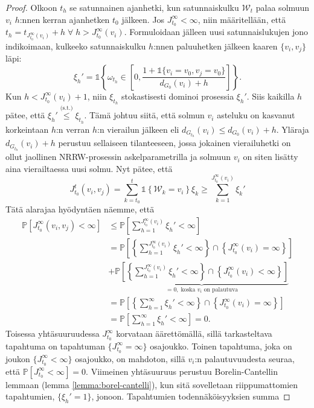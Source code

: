 \documentclass[finnish, 12pt, a4paper, sci, utf8, pdfa]{aaltothesis}
\newcommand{\Wrandom}{\mathcal{W}}
\newcommand{\indicator}{\mathopen{\mathds{1}}}
\newcommand*{\prob}{\mathbb{P}}
\begin{document}
\begin{proof}
   Olkoon $ t_{h} $ se satunnainen ajanhetki, kun satunnaiskulku $ \Wrandom_{t} $ palaa solmuun $ v_{i} $ $ h $:nnen kerran ajanhetken $ t_{0} $ jälkeen. Jos $ J_{t_{0}}^{\infty} < \infty $,
   niin määritellään, että $ t_{h} = t_{J_{t_{0}}^{\infty}(v_{i})} + h \; \forall \; h > J_{t_{0}}^{\infty}(v_{i}) $. Formuloidaan jälleen uusi satunnaislukujen jono indikoimaan, kulkeeko 
   satunnaiskulku $ h $:nnen paluuhetken jälkeen kaaren $ \{ v_{i}, v_{j} \} $ läpi:
   \[
      \xi_{h}' = \indicator \left\{ \omega_{t_{h}} \in \left[ 0, \frac{1 + \indicator \{ v_{i} = v_{0}, v_{j} = v_{0} \}}{d_{G_{0}}(v_{i}) + h} \right] \right\}.
   \]
   Kun $ h < J_{t_{0}}^{\infty}(v_{i}) + 1 $, niin $ \xi_{t_{h}} $ stokastisesti dominoi prosessia $ \xi_{h}' $. Siis kaikilla $ h $ pätee, että $ \xi_{h}' \overset{\text{(s.t.)}}{\leq} \xi_{t_{h}} $.
   Tämä johtuu siitä, että solmun $ v_{i} $ asteluku on kasvanut korkeintaan $ h $:n verran $ h $:n vierailun jälkeen eli $ d_{G_{t_{h}}}(v_{i}) \leq d_{G_{0}}(v_{i}) + h $. Yläraja
   $ d_{G_{t_{h}}}(v_{i}) + h $ perustuu sellaiseen tilanteeseen, jossa jokainen vierailuhetki on ollut jaollinen NRRW-prosessin askelparametrilla ja solmuun $ v_{i} $ on siten lisätty
   aina vierailtaessa uusi solmu. Nyt pätee, että
   \[
      J_{t_{0}}^{t}(v_{i}, v_{j}) = \sum_{k = t_{0}}^{t} \indicator \left\{ \Wrandom_{k} = v_{i} \right\} \xi_{k} \geq \sum_{k = 1}^{J_{t_{0}}^{\infty}(v_{i})} \xi_{k}'
   \]
   Tätä alarajaa hyödyntäen näemme, että
   \begin{align*}
      \prob \left[ J_{t_{0}}^{\infty}(v_{i}, v_{j}) < \infty \right] &\leq \prob \left[ \sum_{h = 1}^{J_{t_{0}}^{\infty}(v_{i})} \xi_{h}' < \infty \right] \\
         &= \prob \left[ \left\{ \sum_{h = 1}^{J_{t_{0}}^{\infty}(v_{i})} \xi_{h}' < \infty \right\} \cap \left\{ J_{t_{0}}^{\infty}(v_{i}) = \infty \right\} \right] \\
         &+ \underbrace{\prob \left[ \left\{ \sum_{h = 1}^{J_{t_{0}}^{\infty}(v_{i})} \xi_{h}' < \infty \right\} \cap \left\{ J_{t_{0}}^{\infty}(v_{i}) < \infty \right\} \right]}_{= 0, \; \text{koska } v_{i} \text{ on palautuva}} \\
         &= \prob \left[ \left\{ \sum_{h = 1}^{\infty} \xi_{h}' < \infty \right\} \cap \left\{ J_{t_{0}}^{\infty}(v_{i}) = \infty \right\} \right] \\
         &= \prob \left[ \sum_{h = 1}^{\infty} \xi_{h}' < \infty \right] = 0.
   \end{align*}
   Toisessa yhtäsuuruudessa $ J_{t_{0}}^{\infty} $ korvataan äärettömällä, sillä tarkasteltava tapahtuma on tapahtuman $ \{ J_{t_{0}}^{\infty} = \infty \} $ osajoukko. Toinen tapahtuma,
   joka on joukon $ \{ J_{t_{0}}^{\infty} < \infty \} $ osajoukko, on mahdoton, sillä $ v_{i} $:n palautuvuudesta seuraa, että $ \prob \left[ J_{t_{0}}^{\infty} < \infty \right] = 0. $
   Viimeinen yhtäsuuruus perustuu Borelin-Cantellin lemmaan (lemma \ref{lemma:borel-cantelli}), kun sitä sovelletaan riippumattomien tapahtumien, $ \{ \xi_{h}' = 1 \} $, jonoon.
   Tapahtumien todennäköisyyksien summa

\end{proof}
\end{document}
